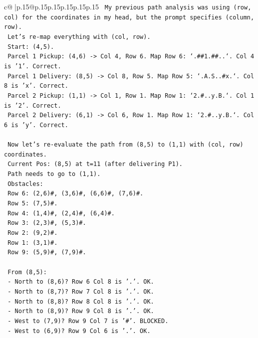 \documentclass{article}
\begin{document}
{\begin{supertabular}{c@{$\;$}|p{.15\linewidth}@{}p{.15\linewidth}p{.15\linewidth}p{.15\linewidth}p{.15\linewidth}p{.15\linewidth}}
{{{\texttt{  My previous path analysis was using (row, col) for the coordinates in my head, but the prompt specifies (column, row).} \\
\texttt{  Let's re{-}map everything with (col, row).} \\
\texttt{  Start: (4,5).} \\
\texttt{  Parcel 1 Pickup: (4,6) {-}> Col 4, Row 6. Map Row 6: `.\#\#1.\#\#..`. Col 4 is '1'. Correct.} \\
\texttt{  Parcel 1 Delivery: (8,5) {-}> Col 8, Row 5. Map Row 5: `.A.S..\#x.`. Col 8 is 'x'. Correct.} \\
\texttt{  Parcel 2 Pickup: (1,1) {-}> Col 1, Row 1. Map Row 1: `2.\#..y.B.`. Col 1 is '2'. Correct.} \\
\texttt{  Parcel 2 Delivery: (6,1) {-}> Col 6, Row 1. Map Row 1: `2.\#..y.B.`. Col 6 is 'y'. Correct.} \\
\\ 
\texttt{  Now let's re{-}evaluate the path from (8,5) to (1,1) with (col, row) coordinates.} \\
\texttt{  Current Pos: (8,5) at t=11 (after delivering P1).} \\
\texttt{  Path needs to go to (1,1).} \\
\texttt{  Obstacles:} \\
\texttt{  Row 6: (2,6)\#, (3,6)\#, (6,6)\#, (7,6)\#.} \\
\texttt{  Row 5: (7,5)\#.} \\
\texttt{  Row 4: (1,4)\#, (2,4)\#, (6,4)\#.} \\
\texttt{  Row 3: (2,3)\#, (5,3)\#.} \\
\texttt{  Row 2: (9,2)\#.} \\
\texttt{  Row 1: (3,1)\#.} \\
\texttt{  Row 9: (5,9)\#, (7,9)\#.} \\
\\ 
\texttt{  From (8,5):} \\
\texttt{  {-} North to (8,6)? Row 6 Col 8 is '.'. OK.} \\
\texttt{  {-} North to (8,7)? Row 7 Col 8 is '.'. OK.} \\
\texttt{  {-} North to (8,8)? Row 8 Col 8 is '.'. OK.} \\
\texttt{  {-} North to (8,9)? Row 9 Col 8 is '.'. OK.} \\
\texttt{  {-} West to (7,9)? Row 9 Col 7 is '\#'. BLOCKED.} \\
\texttt{  {-} West to (6,9)? Row 9 Col 6 is '.'. OK.} \\
}}}
\end{supertabular}}
\end{document}
